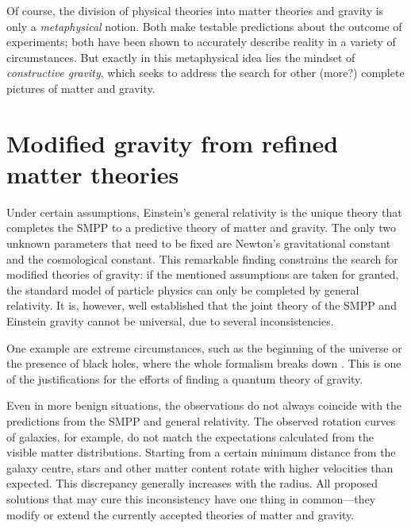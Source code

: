 Of course, the division of physical theories into matter theories and gravity is only a \emph{metaphysical} notion. Both make testable predictions about the outcome of experiments; both have been shown to accurately describe reality in a variety of circumstances. But exactly in this metaphysical idea lies the mindset of \emph{constructive gravity}, which seeks to address the search for other (more?) complete pictures of matter and gravity.

\section{Modified gravity from refined matter theories}
Under certain assumptions, Einstein's general relativity is the unique theory that completes the SMPP to a predictive theory of matter and gravity.\cite{lovelock,hkt,deser} The only two unknown parameters that need to be fixed are Newton's gravitational constant and the cosmological constant. This remarkable finding constrains the search for modified theories of gravity: if the mentioned assumptions are taken for granted, the standard model of particle physics can only be completed by general relativity. It is, however, well established that the joint theory of the SMPP and Einstein gravity cannot be universal, due to several inconsistencies.

One example are extreme circumstances, such as the beginning of the universe or the presence of black holes, where the whole formalism breaks down \cite{}. This is one of the justifications for the efforts of finding a quantum theory of gravity.

Even in more benign situations, the observations do not always coincide with the predictions from the SMPP and general relativity. The observed rotation curves of galaxies, for example, do not match the expectations calculated from the visible matter distributions. Starting from a certain minimum distance from the galaxy centre, stars and other matter content rotate with higher velocities than expected. \cite{} This discrepancy generally increases with the radius. \cite{} All proposed solutions \cite{} that may cure this inconsistency have one thing in common---they modify or extend the currently accepted theories of matter and gravity.

